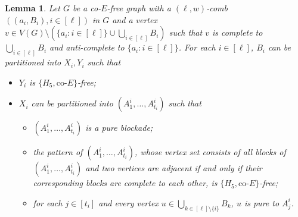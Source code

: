 \documentclass[a4paper,11pt]{article}
\newtheorem{lemma}[theorem]{Lemma}
\begin{document}
\begin{lemma}\label{lem:coro-lem for E}
        Let $G$ be a co-$E$-free graph with a $(\ell,w)$-comb $((a_i,B_i),i\in[\ell])$ in $G$ and a vertex $v\in V(G)\setminus(\{a_i:i\in[\ell]\}\cup\bigcup_{i\in[\ell]}B_i)$ such that $v$ is complete to $\bigcup_{i\in[\ell]}B_i$ and anti-complete to $\{a_i:i\in[\ell]\}$. 
        For each $i\in[\ell]$, $B_i$ can be partitioned into $X_i,Y_i$ such that 
        \begin{itemize}
            \item[$(1)$] $Y_i$ is $\{H_5, \text{co-}E\}$-free;  
            \item[$(2)$] $X_i$ can be partitioned into $(A^i_1,\ldots, A^i_{t_i})$ such that 
            \begin{itemize}
                \item[$(2.1)$] $(A^i_1,\ldots, A^i_{t_i})$ is a pure blockade; 
                \item[$(2.2)$] the pattern of $(A^i_1,\ldots, A^i_{t_i})$, whose vertex set consists of all blocks of $(A^i_1,\ldots, A^i_{t_i})$ and two vertices are adjacent if and only if their corresponding blocks are complete to each other, is $\{H_5, \text{co-}E\}$-free; 
                \item[$(2.3)$] for each $j\in [t_i]$ and every vertex $u\in \bigcup_{k\in [\ell]\setminus \{i\}} B_k$, $u$ is pure to $A^i_j$.
            \end{itemize}
        \end{itemize} 
    \end{lemma}
\end{document}

